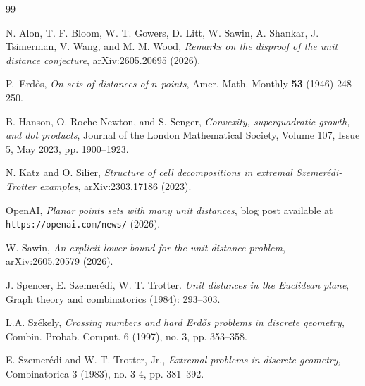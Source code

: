 \documentclass[12pt]{article}
\begin{document}
\begin{thebibliography}{99}

 N. Alon, T. F. Bloom, W. T. Gowers, D. Litt, W. Sawin, A. Shankar, J. Tsimerman, V. Wang, and M. M. Wood, {\it Remarks on the disproof of the unit distance conjecture}, arXiv:2605.20695 (2026).





 P.~Erd\H{o}s, {\it On sets of distances of $n$ points}, Amer. Math. Monthly {\bf 53} (1946) 248--250.

 B. Hanson, O. Roche-Newton, and S. Senger, {\it Convexity, superquadratic growth, and dot products}, Journal of the London Mathematical Society, Volume 107, Issue 5, May 2023, pp. 1900--1923.


 N. Katz and O. Silier, {\it Structure of cell decompositions in extremal Szemer\'edi-Trotter examples}, arXiv:2303.17186 (2023).

 OpenAI, {\it Planar points sets with many unit distances}, blog post available at \texttt{https://openai.com/news/} (2026).

 W. Sawin, {\it An explicit lower bound for the unit distance problem}, arXiv:2605.20579 (2026).

 J. Spencer, E. Szemer\' edi, W. T. Trotter. {\it Unit distances in the Euclidean plane}, Graph theory and combinatorics (1984): 293--303.

 L.A. Sz\'ekely, {\it Crossing numbers and hard Erd\H os problems in discrete geometry,} Combin. Probab. Comput. 6 (1997), no. 3, pp. 353--358.

 E. Szemer\' edi and W. T. Trotter, Jr., {\it Extremal problems in discrete geometry,} Combinatorica 3 (1983), no. 3-4, pp. 381--392.


\end{thebibliography}
\end{document}
